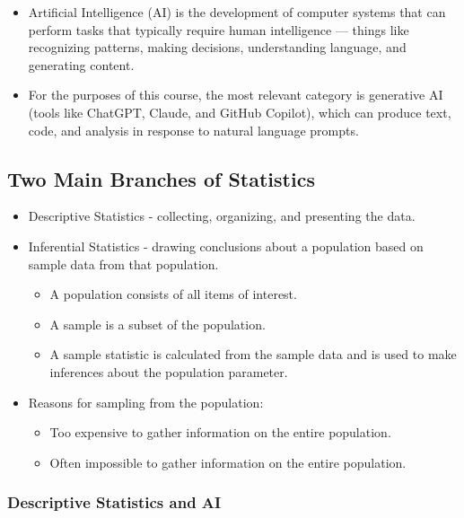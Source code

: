 \documentclass[
  letterpaper,
  DIV=11,
  numbers=noendperiod]{scrreprt}
\providecommand{\tightlist}{%
  \setlength{\itemsep}{0pt}\setlength{\parskip}{0pt}}\usepackage{longtable,booktabs,array}
\begin{document}
\begin{itemize}
\tightlist
\item
  Artificial Intelligence (AI) is the development of computer systems
  that can perform tasks that typically require human intelligence ---
  things like recognizing patterns, making decisions, understanding
  language, and generating content.
\item
  For the purposes of this course, the most relevant category is
  generative AI (tools like ChatGPT, Claude, and GitHub Copilot), which
  can produce text, code, and analysis in response to natural language
  prompts.
\end{itemize}

\subsection{Two Main Branches of
Statistics}\label{two-main-branches-of-statistics}

\begin{itemize}
\tightlist
\item
  Descriptive Statistics - collecting, organizing, and presenting the
  data.
\item
  Inferential Statistics - drawing conclusions about a population based
  on sample data from that population.

  \begin{itemize}
  \tightlist
  \item
    A population consists of all items of interest.
  \item
    A sample is a subset of the population.
  \item
    A sample statistic is calculated from the sample data and is used to
    make inferences about the population parameter.
  \end{itemize}
\item
  Reasons for sampling from the population:

  \begin{itemize}
  \tightlist
  \item
    Too expensive to gather information on the entire population.
  \item
    Often impossible to gather information on the entire population.
  \end{itemize}
\end{itemize}

\subsubsection{Descriptive Statistics and
AI}\label{descriptive-statistics-and-ai}
\end{document}
